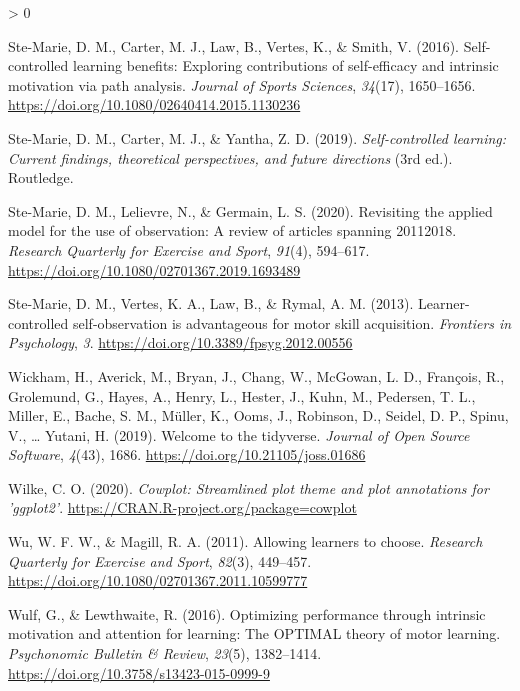 \documentclass[
  english,
  jou]{apa7}
\newlength{\cslhangindent}
\newenvironment{CSLReferences}[2] %
 {%
  \setlength{\parindent}{0pt}
  \ifodd #1 \everypar{\setlength{\hangindent}{\cslhangindent}}\ignorespaces\fi
  \ifnum #2 > 0
  \setlength{\parskip}{#2\baselineskip}
  \fi
 }%
 {}
\begin{document}
\begin{CSLReferences}{1}{0}
\leavevmode\hypertarget{ref-ste-marie2016}{}%
Ste-Marie, D. M., Carter, M. J., Law, B., Vertes, K., \& Smith, V. (2016). Self-controlled learning benefits: Exploring contributions of self-efficacy and intrinsic motivation via path analysis. \emph{Journal of Sports Sciences}, \emph{34}(17), 1650--1656. \url{https://doi.org/10.1080/02640414.2015.1130236}

\leavevmode\hypertarget{ref-ste-marie2019}{}%
Ste-Marie, D. M., Carter, M. J., \& Yantha, Z. D. (2019). \emph{Self-controlled learning: Current findings, theoretical perspectives, and future directions} (3rd ed.). Routledge.

\leavevmode\hypertarget{ref-ste-marie2020}{}%
Ste-Marie, D. M., Lelievre, N., \& Germain, L. S. (2020). Revisiting the applied model for the use of observation: A review of articles spanning 2011{{}}2018. \emph{Research Quarterly for Exercise and Sport}, \emph{91}(4), 594--617. \url{https://doi.org/10.1080/02701367.2019.1693489}

\leavevmode\hypertarget{ref-ste-marie2013}{}%
Ste-Marie, D. M., Vertes, K. A., Law, B., \& Rymal, A. M. (2013). Learner-controlled self-observation is advantageous for motor skill acquisition. \emph{Frontiers in Psychology}, \emph{3}. \url{https://doi.org/10.3389/fpsyg.2012.00556}

\leavevmode\hypertarget{ref-R-tidyverse}{}%
Wickham, H., Averick, M., Bryan, J., Chang, W., McGowan, L. D., François, R., Grolemund, G., Hayes, A., Henry, L., Hester, J., Kuhn, M., Pedersen, T. L., Miller, E., Bache, S. M., Müller, K., Ooms, J., Robinson, D., Seidel, D. P., Spinu, V., \ldots{} Yutani, H. (2019). Welcome to the {tidyverse}. \emph{Journal of Open Source Software}, \emph{4}(43), 1686. \url{https://doi.org/10.21105/joss.01686}

\leavevmode\hypertarget{ref-R-cowplot}{}%
Wilke, C. O. (2020). \emph{Cowplot: Streamlined plot theme and plot annotations for 'ggplot2'}. \url{https://CRAN.R-project.org/package=cowplot}

\leavevmode\hypertarget{ref-wu2011}{}%
Wu, W. F. W., \& Magill, R. A. (2011). Allowing learners to choose. \emph{Research Quarterly for Exercise and Sport}, \emph{82}(3), 449--457. \url{https://doi.org/10.1080/02701367.2011.10599777}

\leavevmode\hypertarget{ref-wulf2016}{}%
Wulf, G., \& Lewthwaite, R. (2016). Optimizing performance through intrinsic motivation and attention for learning: The OPTIMAL theory of motor learning. \emph{Psychonomic Bulletin \& Review}, \emph{23}(5), 1382--1414. \url{https://doi.org/10.3758/s13423-015-0999-9}


\end{CSLReferences}
\end{document}
